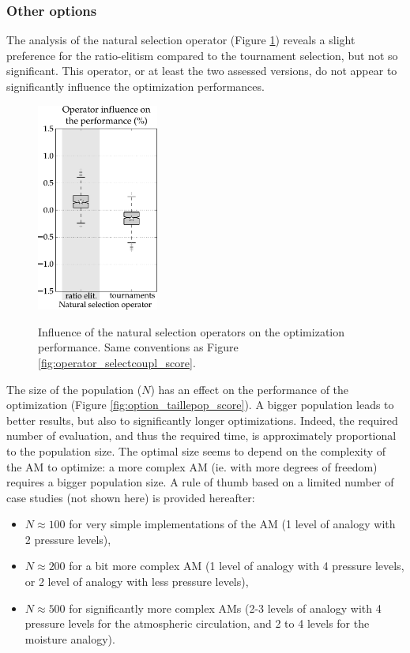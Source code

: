 \documentclass[twocol]{ametsoc}
\begin{document}
\subsubsection{Other options}

The analysis of the natural selection operator (Figure \ref{fig:operator_selectnat_score}) reveals a slight preference for the ratio-elitism compared to the tournament selection, but not so significant. This operator, or at least the two assessed versions, do not appear to significantly influence the optimization performances.

\begin{figure}[htb]
	\begin{center}
		\noindent\includegraphics[width=4cm,angle=0]{figures/operator_selectnat_score.pdf}\\
	\end{center}
	\caption{Influence of the natural selection operators on the optimization performance. Same conventions as Figure \ref{fig:operator_selectcoupl_score}.}
	\label{fig:operator_selectnat_score}
\end{figure}

The size of the population ($N$) has an effect on the performance of the optimization (Figure \ref{fig:option_taillepop_score}). A bigger population leads to better results, but also to significantly longer optimizations. Indeed, the required number of evaluation, and thus the required time, is approximately proportional to the population size. The optimal size seems to depend on the complexity of the AM to optimize: a more complex AM (ie. with more degrees of freedom) requires a bigger population size. A rule of thumb based on a limited number of case studies (not shown here) is provided hereafter:

\begin{itemize}
	\item $N\approx100$ for very simple implementations of the AM (1 level of analogy with 2 pressure levels),
	\item $N\approx200$ for a bit more complex AM (1 level of analogy with 4 pressure levels, or 2 level of analogy with less pressure levels),
	\item $N\approx500$ for significantly more complex AMs (2-3 levels of analogy with 4 pressure levels for the atmospheric circulation, and 2 to 4 levels for the moisture analogy).
\end{itemize}
\end{document}
